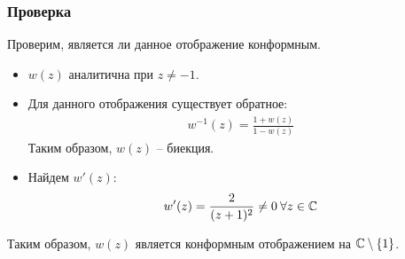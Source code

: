 \begin{frame}\frametitle{Проверка}
	Проверим, является ли данное отображение конформным.

	\begin{itemize}
		\item
		      \(w(z)\) аналитична при \(z \neq -1\).

		\item
		      Для данного отображения существует обратное:
		      \begin{align*}
			      w^{-1}(z) = \frac{1+w(z)}{1 - w(z)}
		      \end{align*}
		      Таким образом, \(w(z)\) -- биекция.

		\item Найдем \(w'(z)\):
		      \begin{align*}
			      w'(z) = \frac{2}{(z+1)^2} \neq 0 \: \forall z \in \mathbb{C}
		      \end{align*}
	\end{itemize}

	Таким образом, \(w(z)\) является конформным отображением
	на \(\mathbb{C} \setminus \{1\}\).
\end{frame}
